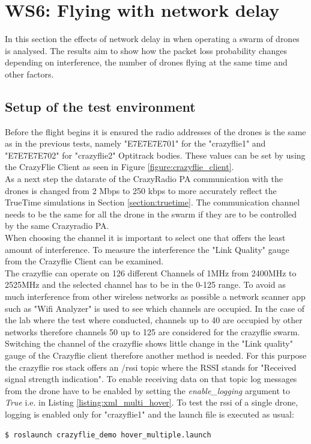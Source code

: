 \section{WS6: Flying with network delay}
\label{section:ws6}
In this section the effects of network delay in when operating a swarm of drones is analysed. The results aim to show how the packet loss probability changes depending on interference, the number of drones flying at the same time and other factors.
\subsection{Setup of the test environment}
Before the flight begins it is ensured the radio addresses of the drones is the same as in the previous tests, namely "E7E7E7E701" for the "crazyflie1" and "E7E7E7E702" for "crazyflie2" Optitrack bodies. These values can be set by using the CrazyFlie Client as seen in Figure \ref{figure:crazyflie_client}.\\
\noindent As a next step the datarate of the CrazyRadio PA communication with the drones is changed from 2 Mbps to 250 kbps to more accurately reflect the TrueTime simulations in Section \ref{section:truetime}. The communication channel needs to be the same for all the drone in the swarm if they are to be controlled by the same Crazyradio PA\cite{book_ros}.\\

\noindent When choosing the channel it is important to select one that offers the least amount of interference. To measure the interference the "Link Quality" gauge from the Crazyflie Client can be examined.\\
\noindent The crazyflie can operate on 126 different Channels of 1MHz from 2400MHz to 2525MHz and the selected channel has to be in the 0-125 range\cite{web_crazyradio_wiki}. To avoid as much interference from other wireless networks as possible a network scanner app such as "Wifi Analyzer"\cite{web_wifi_analyzer_app} is used to see which channels are occupied. In the case of the lab where the test where conducted, channels up to 40 are occupied by other networks therefore channels 50 up to 125 are considered for the crazyflie swarm.\\

\noindent Switching the channel of the crazyflie shows little change in the "Link quality" gauge of the Crazyflie client therefore another method is needed. For this purpose the crazyflie ros stack offers an /rssi topic where the RSSI stands for "Received signal strength indication". To enable receiving data on that topic log messages from the drone have to be enabled by setting the \textit{enable\_logging} argument to \textit{True} i.e. in Listing \ref{listing:xml_multi_hover}. To test the rssi of a single drone, logging is enabled only for "crazyflie1" and the launch file is executed as usual:
\begin{mdframed}[backgroundcolor=light-gray, linecolor=light-gray]
\begin{verbatim}
$ roslaunch crazyflie_demo hover_multiple.launch
\end{verbatim}
\end{mdframed}

